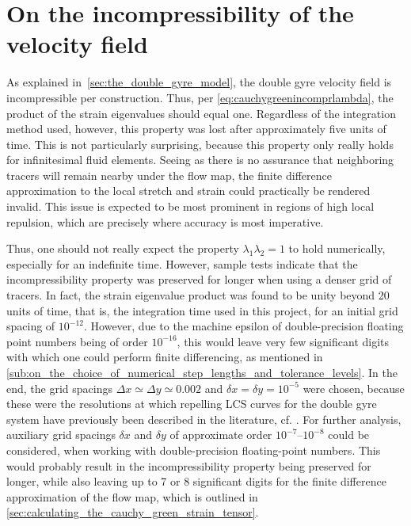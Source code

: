 \section{On the incompressibility of the velocity field}
\label{sec:on_the_incompressibility_of_the_velocity_field}

As explained in~\cref{sec:the_double_gyre_model}, the double gyre velocity field
is incompressible per construction. Thus, per
\cref{eq:cauchygreenincomprlambda}, the product of the strain eigenvalues
should equal one. Regardless of the integration method used, however, this
property was lost after approximately five units of time. This is not
particularly surprising, because this property only really holds for
infinitesimal fluid elements. Seeing as there is no assurance that neighboring
tracers will remain nearby under the flow map, the finite difference
approximation to the local stretch and strain could practically be rendered
invalid. This issue is expected to be most prominent in regions of high local
repulsion, which are precisely where accuracy is most imperative.

Thus, one should not really expect the property $\lambda_{1}\lambda_{2}=1$ to
hold numerically, especially for an indefinite time. However, sample tests
indicate that the incompressibility property was preserved for longer when
using a denser grid of tracers. In fact, the strain eigenvalue product was
found to be unity beyond 20 units of time, that is, the integration time used in
this project, for an initial grid spacing of $10^{-12}$. However, due to the
machine epsilon of double-precision floating point numbers being of order
$10^{-16}$, this would leave very few significant digits with which one could
perform finite differencing, as mentioned in
\cref{sub:on_the_choice_of_numerical_step_lengths_and_tolerance_levels}.
In the end, the grid spacings $\Delta{x}\simeq\Delta{y}\simeq0.002$
and $\delta{x}=\delta{y}=10^{-5}$ were chosen, because these were the
resolutions at which repelling LCS curves for the double
gyre system have previously been described in the literature, cf.
\textcite{farazmand2012computing}. For further analysis, auxiliary grid spacings
$\delta{x}$ and $\delta{y}$ of approximate order $10^{-7}$--$10^{-8}$ could be
considered, when working with double-precision floating-point numbers. This
would probably result in the incompressibility property being preserved for
longer, while also leaving up to 7 or 8 significant digits for the finite
difference approximation of the flow map, which is outlined in
\cref{sec:calculating_the_cauchy_green_strain_tensor}.

